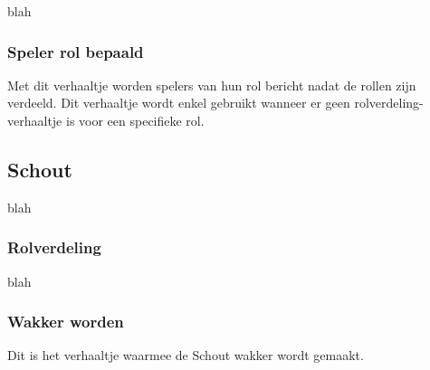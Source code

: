 \documentclass[12pt]{article}
\begin{document}
      blah
  
    \subsubsection{Speler rol bepaald}
    
      Met dit verhaaltje worden spelers van hun rol bericht nadat de rollen zijn verdeeld. Dit verhaaltje wordt enkel gebruikt wanneer er geen rolverdeling-verhaaltje is voor een specifieke rol.
    
      \begin{center}
      \end{center}
  
  \subsection{Schout}
    
      blah
  
    \subsubsection{Rolverdeling}
    
      blah
    
    \subsubsection{Wakker worden}
    
      Dit is het verhaaltje waarmee de Schout wakker wordt gemaakt.
    
\end{document}
